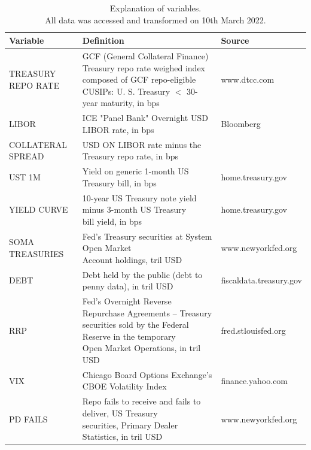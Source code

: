\documentclass[11pt,a4paper,english,oneside]{article}
\begin{document}
\begin{table} \centering
\caption{Explanation of variables.\\
  All data was accessed and transformed on 10th March 2022.}
{\renewcommand{\arraystretch}{2.2} 
\begin{tabular}{lll}
\toprule
  \textbf{Variable} & \textbf{Definition} & \textbf{Source} \\
\midrule
  TREASURY REPO RATE &  \makecell[l]{GCF (General Collateral Finance) Treasury repo rate\\weighed index composed of GCF repo-eligible CUSIPs:\\U. S. Treasury $<$ 30-year maturity, in bps} & www.dtcc.com\\
\hline
  LIBOR & ICE "Panel Bank" Overnight USD LIBOR rate, in bps & Bloomberg\\
\hline
  COLLATERAL SPREAD & USD ON LIBOR rate minus the Treasury repo rate, in bps & \\
\hline
  UST 1M & Yield on generic 1-month US Treasury bill, in bps & home.treasury.gov\\
\hline
  YIELD CURVE & \makecell[l]{10-year US Treasury note yield  minus 3-month US Treasury\\bill yield, in bps} & home.treasury.gov\\
\hline
  SOMA TREASURIES & \makecell[l]{Fed's Treasury securities at System Open Market\\Account holdings, tril USD} & www.newyorkfed.org\\
\hline
  DEBT & Debt held by the public (debt to penny data), in tril USD & fiscaldata.treasury.gov\\
\hline
  RRP & \makecell[l]{Fed's Overnight Reverse Repurchase Agreements -- Treasury\\securities sold by the Federal Reserve in the temporary\\Open Market Operations, in tril USD} & fred.stlouisfed.org\\
\hline
  VIX & Chicago Board Options Exchange's CBOE Volatility Index & finance.yahoo.com\\
\hline
  PD FAILS & \makecell[l]{Repo fails to receive and fails to deliver, US Treasury\\securities, Primary Dealer Statistics, in tril USD} & www.newyorkfed.org \\
  \bottomrule
\end{tabular}}
\label{table:variables}
\end{table}
\end{document}
